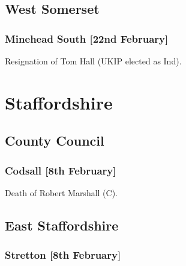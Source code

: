 \documentclass[a4paper,openany]{book}
\begin{document}
\begin{resultsiii}
\subsection*{West Somerset}

\subsubsection*{Minehead South \hspace*{\fill}\nolinebreak[1]%
\enspace\hspace*{\fill}
[22nd February]}


Resignation of Tom Hall (UKIP elected as Ind).

\section{Staffordshire}

\subsection*{County Council}

\subsubsection*{Codsall \hspace*{\fill}\nolinebreak[1]%
\enspace\hspace*{\fill}
[8th February]}


Death of Robert Marshall (C).

\subsection*{East Staffordshire}

\subsubsection*{Stretton \hspace*{\fill}\nolinebreak[1]%
\enspace\hspace*{\fill}
[8th February]}



\end{resultsiii}
\end{document}
